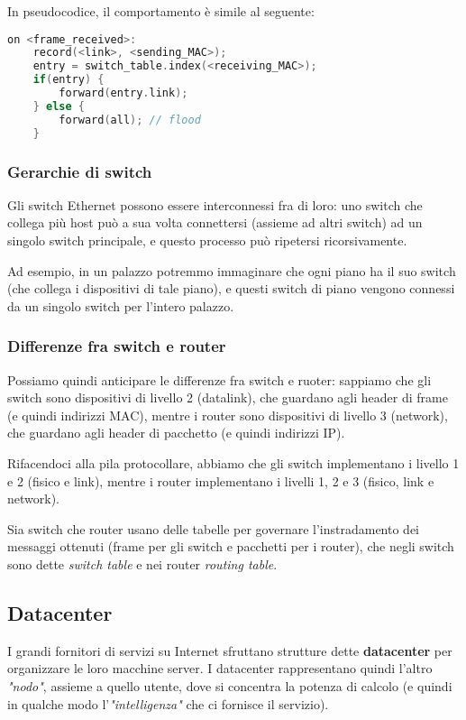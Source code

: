 \documentclass[a4paper,11pt]{article}
\begin{document}
In pseudocodice, il comportamento è simile al seguente:
\begin{lstlisting}[language=C++, style=codestyle]	
on <frame_received>:
	record(<link>, <sending_MAC>);
	entry = switch_table.index(<receiving_MAC>);
	if(entry) {
		forward(entry.link);
	} else {
		forward(all); // flood
	}
\end{lstlisting}

\subsubsection{Gerarchie di switch}
Gli switch Ethernet possono essere interconnessi fra di loro: uno switch che collega più host può a sua volta connettersi (assieme ad altri switch) ad un singolo switch principale, e questo processo può ripetersi ricorsivamente.

Ad esempio, in un palazzo potremmo immaginare che ogni piano ha il suo switch (che collega i dispositivi di tale piano), e questi switch di piano vengono connessi da un singolo switch per l'intero palazzo.

\subsubsection{Differenze fra switch e router}
Possiamo quindi anticipare le differenze fra switch e ruoter: sappiamo che gli switch sono dispositivi di livello 2 (datalink), che guardano agli header di frame (e quindi indirizzi MAC), mentre i router sono dispositivi di livello 3 (network), che guardano agli header di pacchetto (e quindi indirizzi IP). 

Rifacendoci alla pila protocollare, abbiamo che gli switch implementano i livello 1 e 2 (fisico e link), mentre i router implementano i livelli 1, 2 e 3 (fisico, link e network).

Sia switch che router usano delle tabelle per governare l'instradamento dei messaggi ottenuti (frame per gli switch e pacchetti per i router), che negli switch sono dette \textit{switch table} e nei router \textit{routing table}.

\subsection{Datacenter}
I grandi fornitori di servizi su Internet sfruttano strutture dette \textbf{datacenter} per organizzare le loro macchine server.
I datacenter rappresentano quindi l'altro \textit{"nodo"}, assieme a quello utente, dove si concentra la potenza di calcolo (e quindi in qualche modo l'\textit{"intelligenza"} che ci fornisce il servizio).
\end{document}
